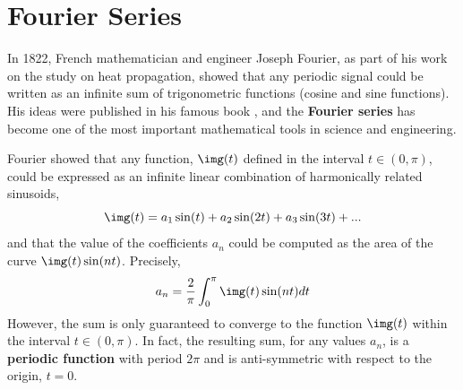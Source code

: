 \section{Fourier Series}




In 1822, French mathematician and engineer Joseph Fourier, as part of his work on the study on heat propagation, showed that
any periodic signal could be written as an infinite sum of trigonometric functions (cosine and sine functions).  His ideas were published in his famous book  \cite{Fourier09}, and the {\bf Fourier series} has become one of the most important mathematical tools in science and engineering.





Fourier showed that any function, $\img (t)$ defined in the interval $t \in (0,\pi)$, could be expressed as an infinite linear combination of harmonically related sinusoids,
\begin{equation}
	\img (t) = a_1 \sin (t) + a_2 \sin (2t) + a_3 \sin (3t) + ...
\end{equation}
and that the value of the coefficients $a_n$ could be computed as the area of the curve $\img(t) \sin (nt)$. Precisely,
\begin{equation}
	a_n = \frac{2}{\pi} \int_0^\pi  \img (t) \sin (nt) dt
\end{equation}
However, the sum is only guaranteed to converge to the function $\img (t)$ within the interval $t \in (0,\pi)$. In fact, the resulting sum, for any values $a_n$, is a {\bf periodic function} with period $2\pi$ and is anti-symmetric with respect to the origin, $t=0$. %

